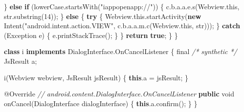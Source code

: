\documentclass[
]{article}
\newenvironment{Shaded}{}{}
\newcommand{\AttributeTok}[1]{\textcolor[rgb]{0.49,0.56,0.16}{#1}}
\newcommand{\BuiltInTok}[1]{\textcolor[rgb]{0.00,0.50,0.00}{#1}}
\newcommand{\CommentTok}[1]{\textcolor[rgb]{0.38,0.63,0.69}{\textit{#1}}}
\newcommand{\ControlFlowTok}[1]{\textcolor[rgb]{0.00,0.44,0.13}{\textbf{#1}}}
\newcommand{\DataTypeTok}[1]{\textcolor[rgb]{0.56,0.13,0.00}{#1}}
\newcommand{\DecValTok}[1]{\textcolor[rgb]{0.25,0.63,0.44}{#1}}
\newcommand{\FunctionTok}[1]{\textcolor[rgb]{0.02,0.16,0.49}{#1}}
\newcommand{\KeywordTok}[1]{\textcolor[rgb]{0.00,0.44,0.13}{\textbf{#1}}}
\newcommand{\NormalTok}[1]{#1}
\newcommand{\OperatorTok}[1]{\textcolor[rgb]{0.40,0.40,0.40}{#1}}
\newcommand{\StringTok}[1]{\textcolor[rgb]{0.25,0.44,0.63}{#1}}
\begin{document}
\begin{Shaded}
\begin{Highlighting}[]
            \OperatorTok{\}} \ControlFlowTok{else} \ControlFlowTok{if} \OperatorTok{(}\NormalTok{lowerCase}\OperatorTok{.}\FunctionTok{startsWith}\OperatorTok{(}\StringTok{"iappopenapp://"}\OperatorTok{))} \OperatorTok{\{}
\NormalTok{                c}\OperatorTok{.}\FunctionTok{b}\OperatorTok{.}\FunctionTok{a}\OperatorTok{.}\FunctionTok{a}\OperatorTok{.}\FunctionTok{e}\OperatorTok{.}\FunctionTok{s}\OperatorTok{(}\NormalTok{Webview}\OperatorTok{.}\FunctionTok{this}\OperatorTok{,}\NormalTok{ str}\OperatorTok{.}\FunctionTok{substring}\OperatorTok{(}\DecValTok{14}\OperatorTok{));}
            \OperatorTok{\}} \ControlFlowTok{else} \OperatorTok{\{}
                \ControlFlowTok{try} \OperatorTok{\{}
\NormalTok{                    Webview}\OperatorTok{.}\FunctionTok{this}\OperatorTok{.}\FunctionTok{startActivity}\OperatorTok{(}\KeywordTok{new} \FunctionTok{Intent}\OperatorTok{(}\StringTok{"android.intent.action.VIEW"}\OperatorTok{,}\NormalTok{ c}\OperatorTok{.}\FunctionTok{b}\OperatorTok{.}\FunctionTok{a}\OperatorTok{.}\FunctionTok{a}\OperatorTok{.}\FunctionTok{m}\OperatorTok{.}\FunctionTok{c}\OperatorTok{(}\NormalTok{Webview}\OperatorTok{.}\FunctionTok{this}\OperatorTok{,}\NormalTok{ str}\OperatorTok{)));}
                \OperatorTok{\}} \ControlFlowTok{catch} \OperatorTok{(}\BuiltInTok{Exception}\NormalTok{ e}\OperatorTok{)} \OperatorTok{\{}
\NormalTok{                    e}\OperatorTok{.}\FunctionTok{printStackTrace}\OperatorTok{();}
                \OperatorTok{\}}
            \OperatorTok{\}}
            \ControlFlowTok{return} \KeywordTok{true}\OperatorTok{;}
        \OperatorTok{\}}
    \OperatorTok{\}}

    \KeywordTok{class}\NormalTok{ i }\KeywordTok{implements}\NormalTok{ DialogInterface}\OperatorTok{.}\FunctionTok{OnCancelListener} \OperatorTok{\{}
        \DataTypeTok{final} \CommentTok{/* synthetic */}\NormalTok{ JsResult a}\OperatorTok{;}

        \FunctionTok{i}\OperatorTok{(}\NormalTok{Webview webview}\OperatorTok{,}\NormalTok{ JsResult jsResult}\OperatorTok{)} \OperatorTok{\{}
            \KeywordTok{this}\OperatorTok{.}\FunctionTok{a} \OperatorTok{=}\NormalTok{ jsResult}\OperatorTok{;}
        \OperatorTok{\}}

        \AttributeTok{@Override} \CommentTok{// android.content.DialogInterface.OnCancelListener}
        \KeywordTok{public} \DataTypeTok{void} \FunctionTok{onCancel}\OperatorTok{(}\NormalTok{DialogInterface dialogInterface}\OperatorTok{)} \OperatorTok{\{}
            \KeywordTok{this}\OperatorTok{.}\FunctionTok{a}\OperatorTok{.}\FunctionTok{confirm}\OperatorTok{();}
        \OperatorTok{\}}
    \OperatorTok{\}}


\end{Highlighting}
\end{Shaded}
\end{document}
